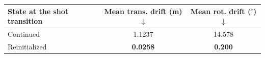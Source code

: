 \begin{tabular}{lcc}
  \toprule
  State at the shot transition & Mean trans. drift (m) $\downarrow$
    & Mean rot. drift ($^\circ$) $\downarrow$ \\
  \midrule
  Continued & 1.1237 & 14.578 \\
  Reinitialized & \textbf{0.0258} & \textbf{0.200} \\
  \bottomrule
\end{tabular}
